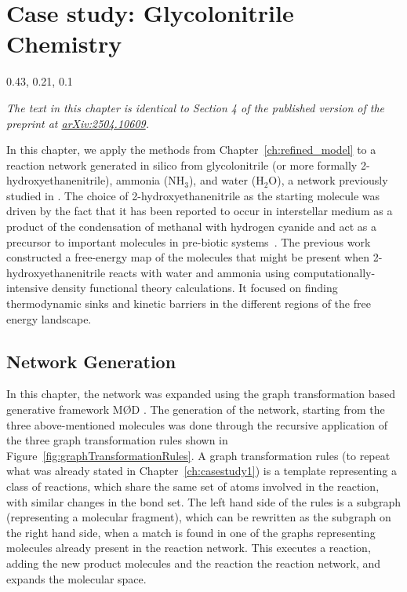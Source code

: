 \chapter[Glycolonitrile Chemistry]{Case study: Glycolonitrile Chemistry}
\label{ch:casestudy2} %

\definecolor{myBrown}{rgb} {0.43, 0.21, 0.1}

{\sffamily\slshape The text in this chapter is identical to Section 4 of the published version of the preprint at \href{https://arxiv.org/abs/2504.10609}{arXiv:2504.10609}.\\}

In this chapter, we apply the methods from Chapter~\ref{ch:refined_model} to a reaction network generated in silico from glycolonitrile (or more formally 2-hydroxyethanenitrile), ammonia (NH$_3$), and water (H$_2$O), a network previously studied in \cite{implemented_CRN}. The choice of 2-hydroxyethanenitrile as the starting molecule was driven by the fact that it has been reported to occur in interstellar medium as a product of the condensation of methanal with hydrogen cyanide and act as a precursor to important molecules in pre-biotic systems~\cite{MeCN_precursor}. The previous work~\cite{implemented_CRN} constructed a free-energy map of the molecules that might be present when 2-hydroxyethanenitrile reacts with water and ammonia using computationally-intensive density functional theory calculations. It focused on finding thermodynamic sinks and kinetic barriers in the different regions of the free energy landscape.

\section{Network Generation}

In this chapter, the network was expanded using the graph transformation based generative framework M{\O}D \cite{mod_web}. The generation of the network, starting from the three above-mentioned molecules was done through the recursive application of the three graph transformation rules shown in Figure~\ref{fig:graphTransformationRules}.
A graph transformation rules (to repeat what was already stated in Chapter~\ref{ch:casestudy1}) is a template representing a class of reactions, which share the same set of atoms involved in the reaction, with similar changes in the bond set. The left hand side of the rules is a subgraph (representing a molecular fragment), which can be rewritten as the subgraph on the right hand side, when a match is found in one of the graphs representing molecules already present in the reaction network. This executes a reaction, adding the new product molecules and the reaction the reaction network, and expands the molecular space.

